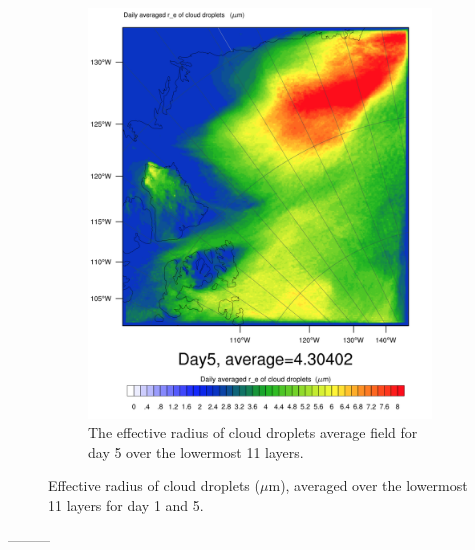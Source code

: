 \begin{figure}[h]
\begin{subfigure}{0.48\textwidth}
		\includegraphics[width=\textwidth]{results/control/recloud_cont_day5.png}
		\caption{The effective radius of cloud droplets average field for day 5 over the lowermost 11 layers.}
		\label{subfig:recloud_r1Day5}
	\end{subfigure}
	\caption{Effective radius of cloud droplets ($\mu\text{m}$), averaged over the lowermost 11 layers for day 1 and 5.}
	\label{fig:recloud_r1}
\end{figure}


---------


